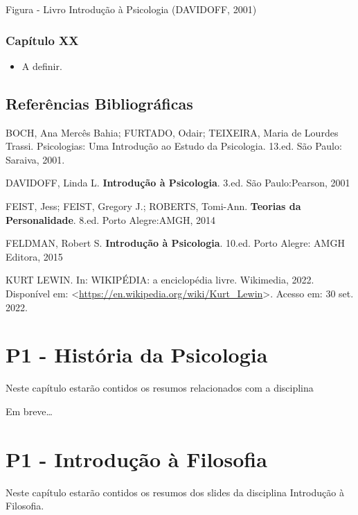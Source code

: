 \documentclass[
]{book}
\providecommand{\tightlist}{%
  \setlength{\itemsep}{0pt}\setlength{\parskip}{0pt}}
\begin{document}
Figura - Livro Introdução à Psicologia (DAVIDOFF, 2001)

\hypertarget{capuxedtulo-xx}{%
\subsection{Capítulo XX}\label{capuxedtulo-xx}}

\begin{itemize}
\tightlist
\item
  A definir.
\end{itemize}

\hypertarget{referuxeancias-bibliogruxe1ficas-1}{%
\section{Referências
Bibliográficas}\label{referuxeancias-bibliogruxe1ficas-1}}

BOCH, Ana Mercês Bahia; FURTADO, Odair; TEIXEIRA, Maria de Lourdes
Trassi. Psicologias: Uma Introdução ao Estudo da Psicologia. 13.ed. São
Paulo: Saraiva, 2001.

DAVIDOFF, Linda L. \textbf{Introdução à Psicologia}. 3.ed. São
Paulo:Pearson, 2001

FEIST, Jess; FEIST, Gregory J.; ROBERTS, Tomi-Ann. \textbf{Teorias da
Personalidade}. 8.ed. Porto Alegre:AMGH, 2014

FELDMAN, Robert S. \textbf{Introdução à Psicologia}. 10.ed. Porto
Alegre: AMGH Editora, 2015

KURT LEWIN. In: WIKIPÉDIA: a enciclopédia livre. Wikimedia, 2022.
Disponível em:
\textless{}\url{https://en.wikipedia.org/wiki/Kurt_Lewin}\textgreater.
Acesso em: 30 set. 2022.

\hypertarget{p1---histuxf3ria-da-psicologia}{%
\chapter{P1 - História da
Psicologia}\label{p1---histuxf3ria-da-psicologia}}

Neste capítulo estarão contidos os resumos relacionados com a disciplina

Em breve\ldots{}

\hypertarget{p1---introduuxe7uxe3o-uxe0-filosofia}{%
\chapter{P1 - Introdução à
Filosofia}\label{p1---introduuxe7uxe3o-uxe0-filosofia}}

Neste capítulo estarão contidos os resumos dos slides da disciplina
Introdução à Filosofia.
\end{document}
